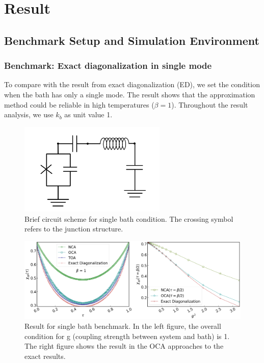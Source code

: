\documentclass{article}[12pt]
\begin{document}
\section{Result}
\begin{spacing}{1.3}
\subsection{Benchmark Setup and Simulation Environment}
\subsubsection*{Benchmark: Exact diagonalization in single mode}
To compare with the result from exact diagonalization (ED), we set the condition when the bath has only a single mode. 
The result shows that the approximation method could be reliable in high temperatures ($\beta = 1$). Throughout the result analysis, we use $k_b$ as unit value 1.
\begin{figure}[htbp]
  \centerline{\includegraphics[width=7cm]{TexFigure/4/4_1_00_Singlebath.png}}
  \caption{Brief circuit scheme for single bath condition. The crossing symbol  refers to the junction structure.}
\end{figure}
\begin{figure}[htbp]
  \centerline{\includegraphics[width=13cm]{TexFigure/4/4_1_01_Single.png}}
  \caption{Result for single bath benchmark. In the left figure, the overall condition for g (coupling strength between system and bath) is 1. The right figure shows the result in the OCA approaches to the exact results.}
\end{figure}\pagebreak

\end{spacing}
\end{document}
